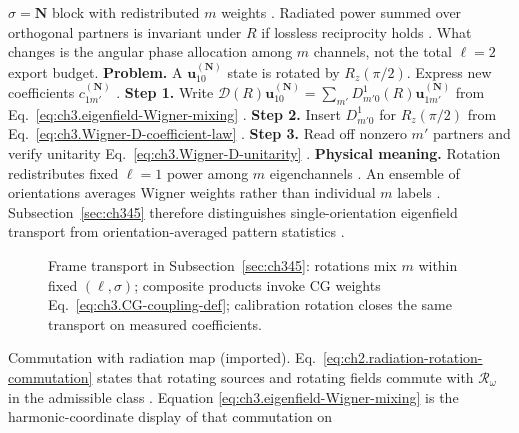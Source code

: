 \(\sigma=\mathbf{N}\) block with redistributed \(m\) weights \cite{jackson1999}. Radiated power summed over
orthogonal partners is invariant under \(R\) if lossless reciprocity holds \cite{stratton1941}. What
changes is the angular phase allocation among \(m\) channels, not the total \(\ell=2\) export budget.
\textbf{Problem.} A \(\mathbf{u}_{10}^{(\mathbf{N})}\) state is rotated by \(R_{z}(\pi/2)\). Express new coefficients
\(c_{1m'}^{(\mathbf{N})}\) \cite{jackson1999}.
\textbf{Step 1.} Write \(\mathcal{D}(R)\mathbf{u}_{10}^{(\mathbf{N})}=\sum_{m'}D_{m'0}^{1}(R)\mathbf{u}_{1m'}^{(\mathbf{N})}\)
from Eq.~\eqref{eq:ch3.eigenfield-Wigner-mixing} \cite{hansen1988}.
\textbf{Step 2.} Insert \(D_{m'0}^{1}\) for \(R_{z}(\pi/2)\) from Eq.~\eqref{eq:ch3.Wigner-D-coefficient-law}
\cite{jackson1999}.
\textbf{Step 3.} Read off nonzero \(m'\) partners and verify unitarity
Eq.~\eqref{eq:ch3.Wigner-D-unitarity} \cite{hansen1988}.
\textbf{Physical meaning.} Rotation redistributes fixed \(\ell=1\) power among \(m\) eigenchannels \cite{harrington2001}.
An ensemble of orientations averages Wigner weights rather than individual \(m\) labels \cite{jackson1999}.
Subsection~\ref{sec:ch345} therefore distinguishes single-orientation eigenfield transport from orientation-averaged
pattern statistics \cite{stratton1941}.
\begin{figure}[t]
\centering
{}
\caption{Frame transport in Subsection~\ref{sec:ch345}: rotations mix \(m\) within fixed \((\ell,\sigma)\); composite
products invoke CG weights Eq.~\eqref{eq:ch3.CG-coupling-def}; calibration rotation closes the same transport on measured coefficients.}
\label{fig:ch3.345-frame-transport}
\end{figure}
Commutation with radiation map (imported). Eq.~\eqref{eq:ch2.radiation-rotation-commutation} states that rotating sources and rotating fields commute with
\(\mathcal{R}_\omega\) in the admissible class \cite{stratton1941}. Equation
\eqref{eq:ch3.eigenfield-Wigner-mixing} is the harmonic-coordinate display of that commutation on
